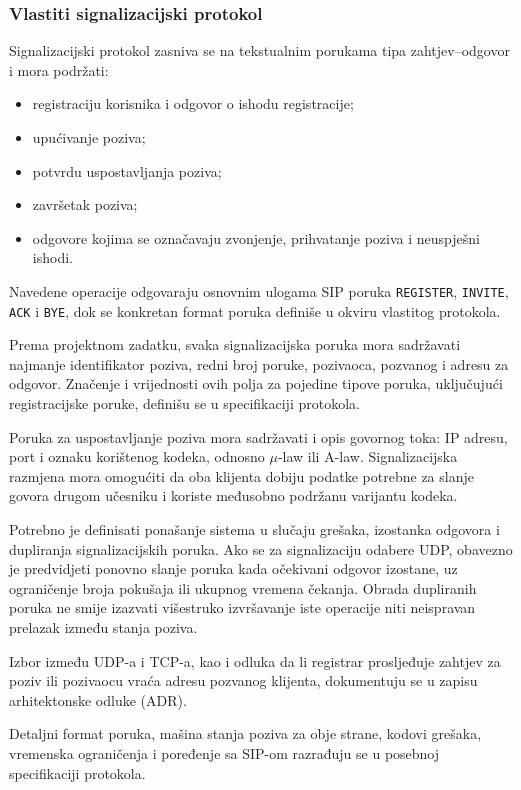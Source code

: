 \subsubsection{Vlastiti signalizacijski protokol}

Signalizacijski protokol zasniva se na tekstualnim porukama tipa zahtjev--odgovor i mora podržati:
\begin{itemize}
    \item registraciju korisnika i odgovor o ishodu registracije;
    \item upućivanje poziva;
    \item potvrdu uspostavljanja poziva;
    \item završetak poziva;
    \item odgovore kojima se označavaju zvonjenje, prihvatanje poziva i neuspješni ishodi.
\end{itemize}

Navedene operacije odgovaraju osnovnim ulogama SIP poruka \texttt{REGISTER}, \texttt{INVITE}, \texttt{ACK} i \texttt{BYE}, dok se konkretan format poruka definiše u okviru vlastitog protokola.

Prema projektnom zadatku, svaka signalizacijska poruka mora sadržavati najmanje identifikator poziva, redni broj poruke, pozivaoca, pozvanog i adresu za odgovor. Značenje i vrijednosti ovih polja za pojedine tipove poruka, uključujući registracijske poruke, definišu se u specifikaciji protokola.

Poruka za uspostavljanje poziva mora sadržavati i opis govornog toka: IP adresu, port i oznaku korištenog kodeka, odnosno $\mu$-law ili A-law. Signalizacijska razmjena mora omogućiti da oba klijenta dobiju podatke potrebne za slanje govora drugom učesniku i koriste međusobno podržanu varijantu kodeka.

Potrebno je definisati ponašanje sistema u slučaju grešaka, izostanka odgovora i dupliranja signalizacijskih poruka. Ako se za signalizaciju odabere UDP, obavezno je predvidjeti ponovno slanje poruka kada očekivani odgovor izostane, uz ograničenje broja pokušaja ili ukupnog vremena čekanja. Obrada dupliranih poruka ne smije izazvati višestruko izvršavanje iste operacije niti neispravan prelazak između stanja poziva.

Izbor između UDP-a i TCP-a, kao i odluka da li registrar prosljeđuje zahtjev za poziv ili pozivaocu vraća adresu pozvanog klijenta, dokumentuju se u zapisu arhitektonske odluke (ADR).

Detaljni format poruka, mašina stanja poziva za obje strane, kodovi grešaka, vremenska ograničenja i poređenje sa SIP-om razrađuju se u posebnoj specifikaciji protokola.

